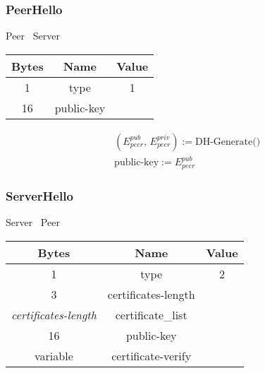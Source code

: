 \documentclass{article}
\begin{document}
    \subsubsection{PeerHello}

    \begin{center}
        Peer \textrightarrow\ Server\\
        \begin{tabular}{|c|c|c|}
            \hline
            \textbf{Bytes} & \textbf{Name} & \textbf{Value} \\
            \hline
            1              & type          & 1              \\
            \hline
            16             & public-key    &                \\
            \hline
        \end{tabular}
    \end{center}

    \begin{align*}
        &(E_{peer}^{pub},\,E_{peer}^{priv}) := \text{DH-Generate()}\\
        &\text{public-key} := E_{peer}^{pub}
    \end{align*}

    \subsubsection{ServerHello}

    \begin{center}
        Server \textrightarrow\ Peer\\
        \begin{tabular}{|c|c|c|}
            \hline
            \textbf{Bytes}             & \textbf{Name}       & \textbf{Value} \\
            \hline
            1                          & type                & 2              \\
            \hline
            3                          & certificates-length &                \\
            \hline
            \emph{certificates-length} & certificate\_list   &                \\
            \hline
            16                         & public-key          &                \\
            \hline
            variable                   & certificate-verify  &                \\
            \hline
        \end{tabular}
    \end{center}
\end{document}

